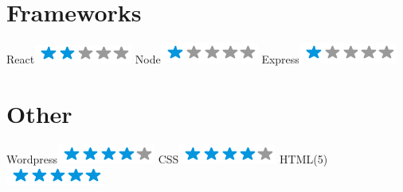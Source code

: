 \begin{aside}
    \section{Frameworks}
      React\includegraphics[scale=0.40]{img/2stars.png}
      Node\includegraphics[scale=0.40]{img/1stars.png}
      Express\includegraphics[scale=0.40]{img/1stars.png}
    \section{Other}
      Wordpress\includegraphics[scale=0.40]{img/4stars.png}
      CSS\includegraphics[scale=0.40]{img/4stars.png}
      HTML(5)\includegraphics[scale=0.40]{img/5stars.png}
  \end{aside}